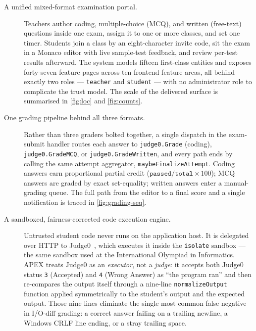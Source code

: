 \begin{description}
  \item[A unified mixed-format examination portal.] Teachers author coding,
    multiple-choice (MCQ), and written (free-text) questions inside one exam,
    assign it to one or more classes, and set one timer. Students join a class
    by an eight-character invite code, sit the exam in a Monaco editor with
    live sample-test feedback, and review per-test results afterward. The
    system models fifteen first-class entities and exposes forty-seven feature
    pages across ten frontend feature areas, all behind exactly two roles ---
    \texttt{teacher} and \texttt{student} --- with no administrator role to
    complicate the trust model. The scale of the delivered surface is
    summarised in \cref{fig:loc} and \cref{fig:counts}.

  \item[One grading pipeline behind all three formats.] Rather than three
    graders bolted together, a single dispatch in the exam-submit handler
    routes each answer to \texttt{judge0.Grade} (coding),
    \texttt{judge0.GradeMCQ}, or \texttt{judge0.GradeWritten}, and every path
    ends by calling the same attempt aggregator, \texttt{maybeFinalizeAttempt}.
    Coding answers earn proportional partial credit
    (\(\texttt{passed}/\texttt{total}\times100\)); MCQ answers are graded by
    exact set-equality; written answers enter a manual-grading queue. The full
    path from the editor to a final score and a single notification is traced
    in \cref{fig:grading-seq}.

  \item[A sandboxed, fairness-corrected code execution engine.] Untrusted
    student code never runs on the application host. It is delegated over HTTP
    to Judge0~\cite{judge0,dosilovic2018judge0}, which executes it inside the
    \texttt{isolate} sandbox --- the same sandbox used at the International
    Olympiad in Informatics. APEX treats Judge0 as an \emph{executor}, not a
    \emph{judge}: it accepts both Judge0 status \texttt{3} (Accepted) and
    \texttt{4} (Wrong Answer) as ``the program ran'' and then re-compares the
    output itself through a nine-line \texttt{normalizeOutput} function applied
    symmetrically to the student's output and the expected output. Those nine
    lines eliminate the single most common false negative in I/O-diff grading:
    a correct answer failing on a trailing newline, a Windows CRLF line ending,
    or a stray trailing space.


\end{description}
